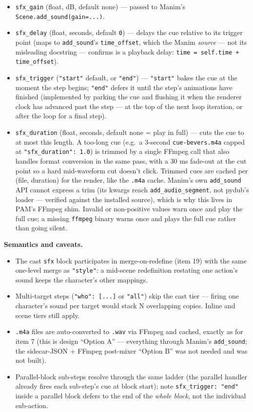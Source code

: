 \documentclass[
  12pt,
  letterpaper,
]{book}
\begin{document}
\begin{itemize}
\item
  \texttt{sfx\_gain} (float, dB, default none) --- passed to Manim's
  \texttt{Scene.add\_sound(gain=...)}.
\item
  \texttt{sfx\_delay} (float, seconds, default \texttt{0}) --- delays
  the cue relative to its trigger point (maps to \texttt{add\_sound}'s
  \texttt{time\_offset}, which the Manim \emph{source} --- not its
  misleading docstring --- confirms is a playback delay:
  \texttt{time = self.time + time\_offset}).
\item
  \texttt{sfx\_trigger} (\texttt{"start"} default, or \texttt{"end"})
  --- \texttt{"start"} bakes the cue at the moment the step begins;
  \texttt{"end"} defers it until the step's animations have finished
  (implemented by parking the cue and flushing it when the renderer
  clock has advanced past the step --- at the top of the next loop
  iteration, or after the loop for a final step).
\item
  \texttt{sfx\_duration} (float, seconds, default none = play in
  full) --- cuts the cue to at most this length. A too-long cue
  (e.g.\ a 3-second \texttt{cue-bevers.m4a} capped at
  \texttt{"sfx\_duration": 1.0}) is trimmed by a single FFmpeg call
  that also handles format conversion in the same pass, with a 30 ms
  fade-out at the cut point so a hard mid-waveform cut doesn't click.
  Trimmed cues are cached per (file, duration) for the render, like
  the \texttt{.m4a} cache. Manim's own \texttt{add\_sound} API cannot
  express a trim (its kwargs reach \texttt{add\_audio\_segment}, not
  pydub's loader --- verified against the installed source), which is
  why this lives in PAM's FFmpeg shim. Invalid or non-positive values
  warn once and play the full cue; a missing \texttt{ffmpeg} binary
  warns once and plays the full cue rather than going silent.
\end{itemize}

\textbf{Semantics and caveats.}

\begin{itemize}
\item
  The cast \texttt{sfx} block participates in merge-on-redefine
  (item 19) with the same one-level merge as \texttt{"style"}: a
  mid-scene redefinition restating one action's sound keeps the
  character's other mappings.
\item
  Multi-target steps (\texttt{"who": [...]} or \texttt{"all"}) skip
  the cast tier --- firing one character's sound per target would
  stack N overlapping copies. Inline and scene tiers still apply.
\item
  \texttt{.m4a} files are auto-converted to \texttt{.wav} via FFmpeg
  and cached, exactly as for item 7 (this is design ``Option A'' ---
  everything through Manim's \texttt{add\_sound}; the sidecar-JSON +
  FFmpeg post-mixer ``Option B'' was not needed and was not built).
\item
  Parallel-block sub-steps resolve through the same ladder (the
  parallel handler already fires each sub-step's cue at block start);
  note \texttt{sfx\_trigger: "end"} inside a parallel block defers to
  the end of the \emph{whole block}, not the individual sub-action.
\end{itemize}
\end{document}
